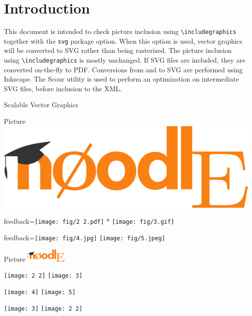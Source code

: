 \documentclass{article}
\begin{document}
\section*{Introduction}

This document is intended to check picture inclusion using 
\verb|\includegraphics| together with the \texttt{svg} package option.
When this option is used, vector graphics will be converted to SVG rather than 
being rasterized. The picture inclusion using \verb|\includegraphics| is mostly 
unchanged. If SVG files are included, they are converted on-the-fly to PDF.
Conversions from and to SVG are performed using \textsf{Inkscape}. The 
\textsf{Scour} utility is used to perform an optimization on intermediate SVG 
files, before inclusion to the XML.

\begin{quiz}{Scalable Vector Graphics}

\begin{multi}{Picture}
\includegraphics{fig/NoodlE_logo.SVG}
\item[feedback={\texttt{[image: fig/2 2.pdf]}}]* \texttt{[image: fig/3.gif]}
\item[feedback={\texttt{[image: fig/4.jpg]}}] \texttt{[image: fig/5.jpeg]}
\end{multi}

\graphicspath{{./fig/}}

\begin{matching}[dd]{Picture}
\includegraphics[width=2cm]{NoodlE_logo.SVG}
\item \texttt{[image: 2 2]} \answer \texttt{[image: 3]}
\item \texttt{[image: 4]} \answer \texttt{[image: 5]}
\item \texttt{[image: 3]} \answer \texttt{[image: 2 2]}
\end{matching}

\end{quiz}
\end{document}
